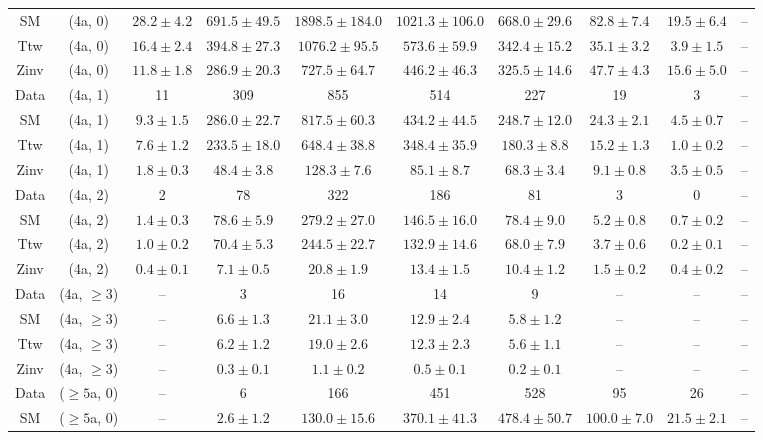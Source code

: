 \begin{table}[h!]
{\begin{tabular}{cccccccccc}
	SM & (4a, 0) & $28.2\pm 4.2$ & $691.5\pm 49.5$ & $1898.5\pm 184.0$ & $1021.3\pm 106.0$ & $668.0\pm 29.6$ & $82.8\pm 7.4$ & $19.5\pm 6.4$ & -- \\[0.5ex] 
	Ttw & (4a, 0) & $16.4\pm 2.4$ & $394.8\pm 27.3$ & $1076.2\pm 95.5$ & $573.6\pm 59.9$ & $342.4\pm 15.2$ & $35.1\pm 3.2$ & $3.9\pm 1.5$ & -- \\[0.5ex] 
	Zinv & (4a, 0) & $11.8\pm 1.8$ & $286.9\pm 20.3$ & $727.5\pm 64.7$ & $446.2\pm 46.3$ & $325.5\pm 14.6$ & $47.7\pm 4.3$ & $15.6\pm 5.0$ & -- \\[0.5ex] 
	Data & (4a, 1) & 11 & 309 & 855 & 514 & 227 & 19 & 3 & -- \\[0.5ex] 
	SM & (4a, 1) & $9.3\pm 1.5$ & $286.0\pm 22.7$ & $817.5\pm 60.3$ & $434.2\pm 44.5$ & $248.7\pm 12.0$ & $24.3\pm 2.1$ & $4.5\pm 0.7$ & -- \\[0.5ex] 
	Ttw & (4a, 1) & $7.6\pm 1.2$ & $233.5\pm 18.0$ & $648.4\pm 38.8$ & $348.4\pm 35.9$ & $180.3\pm 8.8$ & $15.2\pm 1.3$ & $1.0\pm 0.2$ & -- \\[0.5ex] 
	Zinv & (4a, 1) & $1.8\pm 0.3$ & $48.4\pm 3.8$ & $128.3\pm 7.6$ & $85.1\pm 8.7$ & $68.3\pm 3.4$ & $9.1\pm 0.8$ & $3.5\pm 0.5$ & -- \\[0.5ex] 
	Data & (4a, 2) & 2 & 78 & 322 & 186 & 81 & 3 & 0 & -- \\[0.5ex] 
	SM & (4a, 2) & $1.4\pm 0.3$ & $78.6\pm 5.9$ & $279.2\pm 27.0$ & $146.5\pm 16.0$ & $78.4\pm 9.0$ & $5.2\pm 0.8$ & $0.7\pm 0.2$ & -- \\[0.5ex] 
	Ttw & (4a, 2) & $1.0\pm 0.2$ & $70.4\pm 5.3$ & $244.5\pm 22.7$ & $132.9\pm 14.6$ & $68.0\pm 7.9$ & $3.7\pm 0.6$ & $0.2\pm 0.1$ & -- \\[0.5ex] 
	Zinv & (4a, 2) & $0.4\pm 0.1$ & $7.1\pm 0.5$ & $20.8\pm 1.9$ & $13.4\pm 1.5$ & $10.4\pm 1.2$ & $1.5\pm 0.2$ & $0.4\pm 0.2$ & -- \\[0.5ex] 
	Data & (4a, $\ge3$) & -- & 3 & 16 & 14 & 9 & -- & -- & -- \\[0.5ex] 
	SM & (4a, $\ge3$) & -- & $6.6\pm 1.3$ & $21.1\pm 3.0$ & $12.9\pm 2.4$ & $5.8\pm 1.2$ & -- & -- & -- \\[0.5ex] 
	Ttw & (4a, $\ge3$) & -- & $6.2\pm 1.2$ & $19.0\pm 2.6$ & $12.3\pm 2.3$ & $5.6\pm 1.1$ & -- & -- & -- \\[0.5ex] 
	Zinv & (4a, $\ge3$) & -- & $0.3\pm 0.1$ & $1.1\pm 0.2$ & $0.5\pm 0.1$ & $0.2\pm 0.1$ & -- & -- & -- \\[0.5ex] 
	Data & ($\ge5$a, 0) & -- & 6 & 166 & 451 & 528 & 95 & 26 & -- \\[0.5ex] 
	SM & ($\ge5$a, 0) & -- & $2.6\pm 1.2$ & $130.0\pm 15.6$ & $370.1\pm 41.3$ & $478.4\pm 50.7$ & $100.0\pm 7.0$ & $21.5\pm 2.1$ & -- \\[0.5ex] 

\end{tabular}}
\end{table}
